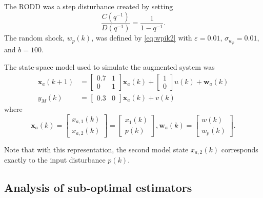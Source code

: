 The \gls{RODD} was a step disturbance created by setting
\begin{equation}
	\frac{C(q^{-1})}{D(q^{-1})} = \frac{1}{1-q^{-1}}.
\end{equation}
The random shock, $w_p(k)$, was defined by \eqref{eq:wpik2} with $\varepsilon=0.01$, $\sigma_{w_p}=0.01$, and $b=100$.

The state-space model used to simulate the augmented system was
\begin{equation} \label{eq:sim-sys-siso-ss-aug}
	\begin{split}
	\mathbf{x}_{a}(k+1) & =\left[\begin{array}{cc}
		0.7 & 1 \\
		0 & 1
	\end{array}\right] \mathbf{x}_{a}(k)+\left[\begin{array}{l}
		1 \\
		0
	\end{array}\right] u(k) + \mathbf{w}_{a}(k) \\
	y_M(k) & =\left[\begin{array}{cc}
	0.3 & 0
\end{array}\right] \mathbf{x}_{a}(k) + v(k)
\end{split}
\end{equation}
where
\begin{equation} \label{eq:sim-sys-siso-ss-aug2}
		\mathbf{x}_{a}(k) = \left[\begin{array}{l}
			x_{a,1}(k) \\
			x_{a,2}(k)
		\end{array}\right] = \left[\begin{array}{l}
		x_{1}(k) \\
		p(k)
	\end{array}\right], \mathbf{w}_{a}(k) = \left[\begin{array}{l}
	w(k) \\
	w_{p}(k)
\end{array}\right] .
\end{equation}

Note that with this representation, the second model state $x_{a,2}(k)$ corresponds exactly to the input disturbance $p(k)$.

\subsection{Analysis of sub-optimal estimators} \label{sec:sim-obs-lin-1-SKF-analysis}

